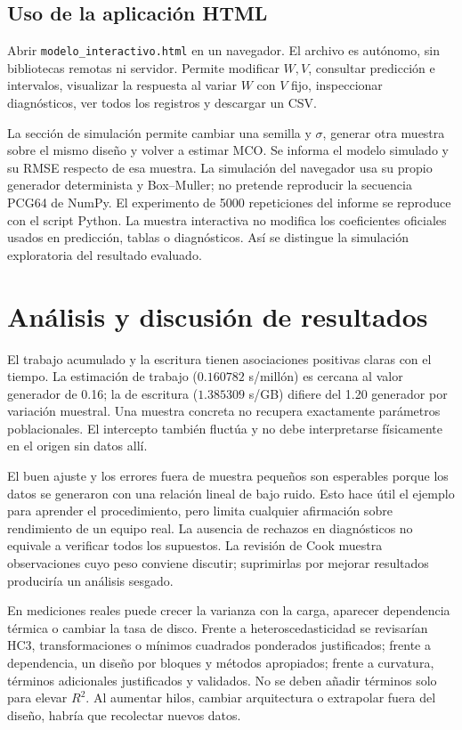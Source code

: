 \documentclass[11pt,a4paper]{article}
\begin{document}
\subsection{Uso de la aplicación HTML}
Abrir \texttt{modelo\_interactivo.html} en un navegador. El archivo es autónomo, sin bibliotecas remotas ni servidor. Permite modificar $W,V$, consultar predicción e intervalos, visualizar la respuesta al variar $W$ con $V$ fijo, inspeccionar diagnósticos, ver todos los registros y descargar un CSV.

La sección de simulación permite cambiar una semilla y $\sigma$, generar otra muestra sobre el mismo diseño y volver a estimar MCO. Se informa el modelo simulado y su RMSE respecto de esa muestra. La simulación del navegador usa su propio generador determinista y Box--Muller; no pretende reproducir la secuencia PCG64 de NumPy. El experimento de 5000 repeticiones del informe se reproduce con el script Python. La muestra interactiva no modifica los coeficientes oficiales usados en predicción, tablas o diagnósticos. Así se distingue la simulación exploratoria del resultado evaluado.

\section{Análisis y discusión de resultados}
El trabajo acumulado y la escritura tienen asociaciones positivas claras con el tiempo. La estimación de trabajo ($0.160782$ s/millón) es cercana al valor generador de 0.16; la de escritura ($1.385309$ s/GB) difiere del 1.20 generador por variación muestral. Una muestra concreta no recupera exactamente parámetros poblacionales. El intercepto también fluctúa y no debe interpretarse físicamente en el origen sin datos allí.

El buen ajuste y los errores fuera de muestra pequeños son esperables porque los datos se generaron con una relación lineal de bajo ruido. Esto hace útil el ejemplo para aprender el procedimiento, pero limita cualquier afirmación sobre rendimiento de un equipo real. La ausencia de rechazos en diagnósticos no equivale a verificar todos los supuestos. La revisión de Cook muestra observaciones cuyo peso conviene discutir; suprimirlas por mejorar resultados produciría un análisis sesgado.

En mediciones reales puede crecer la varianza con la carga, aparecer dependencia térmica o cambiar la tasa de disco. Frente a heteroscedasticidad se revisarían HC3, transformaciones o mínimos cuadrados ponderados justificados; frente a dependencia, un diseño por bloques y métodos apropiados; frente a curvatura, términos adicionales justificados y validados. No se deben añadir términos solo para elevar $R^2$. Al aumentar hilos, cambiar arquitectura o extrapolar fuera del diseño, habría que recolectar nuevos datos.
\end{document}
